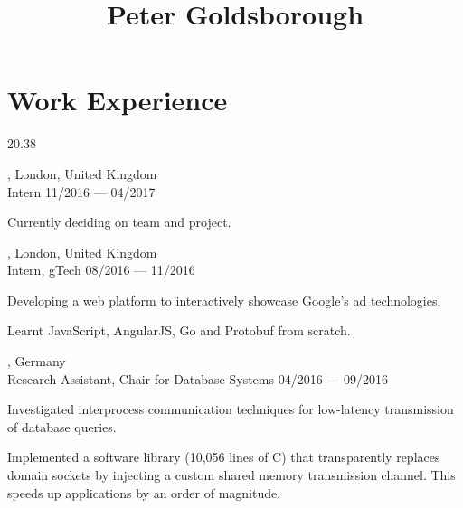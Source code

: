 




\begin{header}
	\title{Peter Goldsborough}
	\separate
	\separate
\end{header}

\section{Work Experience}{2}{0.38}

\begin{entry}
	{, London, United Kingdom}
	{\\Intern}
	{11/2016 --- 04/2017}
  \vspace{-1mm}
	\item Currently deciding on team and project.
\end{entry}

\begin{entry}
	{, London, United Kingdom}
	{\\Intern, gTech}
	{08/2016 --- 11/2016}
	\item Developing a web platform to interactively showcase Google's ad technologies.
  \item Learnt JavaScript, AngularJS, Go and Protobuf from scratch.
\end{entry}

\begin{entry}
	{, Germany}
	{\\Research Assistant, Chair for Database Systems}
	{04/2016 --- 09/2016}

  \item Investigated interprocess communication techniques for low-latency transmission of database queries.
  \item Implemented a software library (10,056 lines of C) that transparently replaces domain sockets by injecting a custom shared memory transmission channel. This speeds up applications by an order of magnitude.
\end{entry}


